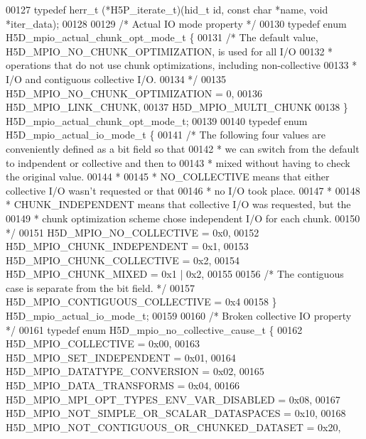 \begin{DoxyCode}
00127 \textcolor{keyword}{typedef} herr\_t (*H5P\_iterate\_t)(hid\_t id, \textcolor{keyword}{const} \textcolor{keywordtype}{char} *name, \textcolor{keywordtype}{void} *iter\_data);
00128 
00129 \textcolor{comment}{/* Actual IO mode property */}
00130 \textcolor{keyword}{typedef} \textcolor{keyword}{enum} H5D\_mpio\_actual\_chunk\_opt\_mode\_t \{
00131     \textcolor{comment}{/* The default value, H5D\_MPIO\_NO\_CHUNK\_OPTIMIZATION, is used for all I/O}
00132 \textcolor{comment}{     * operations that do not use chunk optimizations, including non-collective}
00133 \textcolor{comment}{     * I/O and contiguous collective I/O.}
00134 \textcolor{comment}{     */}
00135     H5D\_MPIO\_NO\_CHUNK\_OPTIMIZATION = 0,
00136     H5D\_MPIO\_LINK\_CHUNK,
00137     H5D\_MPIO\_MULTI\_CHUNK
00138 \}  H5D\_mpio\_actual\_chunk\_opt\_mode\_t;
00139 
00140 \textcolor{keyword}{typedef} \textcolor{keyword}{enum} H5D\_mpio\_actual\_io\_mode\_t \{
00141     \textcolor{comment}{/* The following four values are conveniently defined as a bit field so that}
00142 \textcolor{comment}{     * we can switch from the default to indpendent or collective and then to}
00143 \textcolor{comment}{     * mixed without having to check the original value. }
00144 \textcolor{comment}{     * }
00145 \textcolor{comment}{     * NO\_COLLECTIVE means that either collective I/O wasn't requested or that }
00146 \textcolor{comment}{     * no I/O took place.}
00147 \textcolor{comment}{     *}
00148 \textcolor{comment}{     * CHUNK\_INDEPENDENT means that collective I/O was requested, but the}
00149 \textcolor{comment}{     * chunk optimization scheme chose independent I/O for each chunk.}
00150 \textcolor{comment}{     */}
00151     H5D\_MPIO\_NO\_COLLECTIVE = 0x0,
00152     H5D\_MPIO\_CHUNK\_INDEPENDENT = 0x1,
00153     H5D\_MPIO\_CHUNK\_COLLECTIVE = 0x2,
00154     H5D\_MPIO\_CHUNK\_MIXED = 0x1 | 0x2,
00155 
00156     \textcolor{comment}{/* The contiguous case is separate from the bit field. */}
00157     H5D\_MPIO\_CONTIGUOUS\_COLLECTIVE = 0x4
00158 \} H5D\_mpio\_actual\_io\_mode\_t; 
00159 
00160 \textcolor{comment}{/* Broken collective IO property */}
00161 \textcolor{keyword}{typedef} \textcolor{keyword}{enum} H5D\_mpio\_no\_collective\_cause\_t \{
00162     H5D\_MPIO\_COLLECTIVE = 0x00,
00163     H5D\_MPIO\_SET\_INDEPENDENT = 0x01,
00164     H5D\_MPIO\_DATATYPE\_CONVERSION = 0x02,
00165     H5D\_MPIO\_DATA\_TRANSFORMS = 0x04,
00166     H5D\_MPIO\_MPI\_OPT\_TYPES\_ENV\_VAR\_DISABLED = 0x08,
00167     H5D\_MPIO\_NOT\_SIMPLE\_OR\_SCALAR\_DATASPACES = 0x10,
00168     H5D\_MPIO\_NOT\_CONTIGUOUS\_OR\_CHUNKED\_DATASET = 0x20,

\end{DoxyCode}
